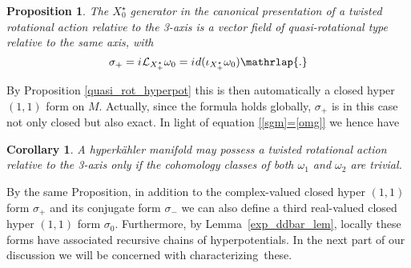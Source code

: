 \documentclass[11pt]{amsart}
\newtheorem{proposition}[theorem]{Proposition}
\newtheorem{corollary}[theorem]{Corollary}
\theoremstyle{remark}
\theoremstyle{remark}
\theoremstyle{definition}
\theoremstyle{definition}
\theoremstyle{definition}
\newcommand{\0}{{\scriptstyle 0'}} %
\newcommand{\1}{{\scriptstyle 1'}}
\newcommand{\hp}{\hspace{0.5pt}} %
\begin{document}
\begin{proposition} \label{middle_q-rot}
The $X^{\star}_0$ generator in the canonical presentation of a twisted rotational action relative to the 3-axis is a vector field of quasi-rotational type relative to the same axis, with
\begin{equation}
\sigma_+ = i\hp \mathcal{L}_{X^{\star}_+} \omega_0 = i\hp d(\iota_{X^{\star}_+}\omega_0) \mathrlap{.}
\end{equation}
\end{proposition}

\noindent  By Proposition \ref{quasi_rot_hyperpot} this is then automatically a closed hyper $(1,1)$ form on $M$. Actually, since the formula holds globally, $\sigma_+$ is in this case not only closed but also exact. In light of equation \eqref{[sgm]=[omg]} we hence have

\begin{corollary} \label{transv-triv}
A hyperk\"ahler manifold may possess a twisted rotational action relative to the 3-axis only if the cohomology classes of both $\omega_1$ and $\omega_2$ are trivial.
\end{corollary}

\noindent By the same Proposition, in addition to the complex-valued closed hyper $(1,1)$ form $\sigma_+$ and its conjugate form $\sigma_-$ we can also define a third real-valued closed hyper $(1,1)$ form $\sigma_0$. Furthermore, by Lemma~\ref{exp_ddbar_lem}, locally these forms have associated recursive chains of hyperpotentials. In the next part of our discussion we will be concerned with \mbox{characterizing these}. 
\end{document}
